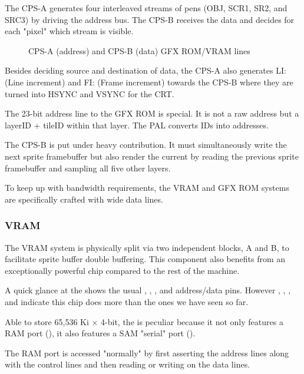  The CPS-A generates four interleaved streams of pens (OBJ, SCR1, SR2, and SRC3) by driving the address bus.
  The CPS-B receives the data and decides for each "pixel" which stream is visible. 


\begin{figure}[H]
\caption*{CPS-A (address) and CPS-B (data) GFX ROM/VRAM lines}
\end{figure}

Besides deciding source and destination of data, the CPS-A also generates LI: (Line increment) and FI: (Frame increment) towards the CPS-B where they are turned into HSYNC and VSYNC for the CRT.

The 23-bit address line to the GFX ROM is special. It is not a raw address but a layerID + tileID within that layer. The PAL  converts IDs into addresses.


The CPS-B is put under heavy contribution. It must simultaneously write the next sprite framebuffer but also render the current by reading the previous sprite framebuffer and sampling all five other layers.


To keep up with bandwidth requirements, the VRAM and GFX ROM systems are specifically crafted with wide data lines.








\subsubsection{VRAM}
The VRAM system is physically split via two independent blocks, A and B, to facilitate sprite buffer double buffering. This component also benefits from an exceptionally powerful chip compared to the rest of the machine.

A quick glance at the  shows the usual , , , and address/data pins. However , , , and  indicate this chip does more than the ones we have seen so far.


Able to store 65,536 Ki $\times$ 4-bit, the  is peculiar because it not only features a RAM port (), it also features a SAM "serial" port ().
 
The RAM port is accessed "normally" by first asserting the address lines along with the control lines and then reading or writing on the data lines.

